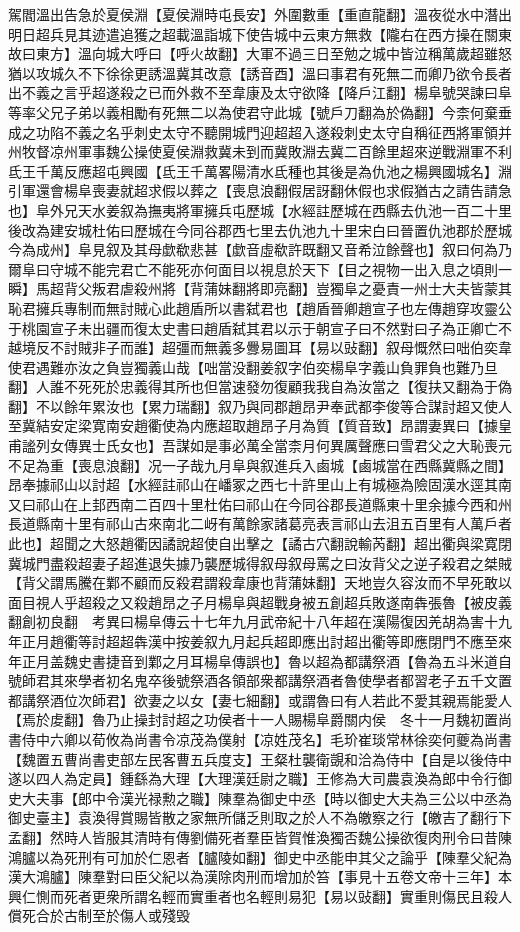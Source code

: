 駕閻溫出告急於夏侯淵【夏侯淵時屯長安】外圍數重【重直龍翻】溫夜從水中潛出明日超兵見其迹遣追獲之超載溫詣城下使告城中云東方無救【隴右在西方操在關東故曰東方】溫向城大呼曰【呼火故翻】大軍不過三日至勉之城中皆泣稱萬歲超雖怒猶以攻城久不下徐徐更誘溫冀其改意【誘音酉】溫曰事君有死無二而卿乃欲令長者出不義之言乎超遂殺之已而外救不至韋康及太守欲降【降戶江翻】楊阜號哭諫曰阜等率父兄子弟以義相勵有死無二以為使君守此城【號戶刀翻為於偽翻】今柰何棄垂成之功陷不義之名乎刺史太守不聽開城門迎超超入遂殺刺史太守自稱征西將軍領并州牧督凉州軍事魏公操使夏侯淵救冀未到而冀敗淵去冀二百餘里超來逆戰淵軍不利氐王千萬反應超屯興國【氐王千萬畧陽清水氐種也其後是為仇池之楊興國城名】淵引軍還會楊阜喪妻就超求假以葬之【喪息浪翻假居訝翻休假也求假猶古之請告請急也】阜外兄天水姜叙為撫夷將軍擁兵屯歷城【水經註歷城在西縣去仇池一百二十里後改為建安城杜佑曰歷城在今同谷郡西七里去仇池九十里宋白曰晉置仇池郡於歷城今為成州】阜見叙及其母歔欷悲甚【歔音虛欷許既翻又音希泣餘聲也】叙曰何為乃爾阜曰守城不能完君亡不能死亦何面目以視息於天下【目之視物一出入息之頃則一瞬】馬超背父叛君虐殺州將【背蒲妹翻將即亮翻】豈獨阜之憂責一州士大夫皆蒙其恥君擁兵專制而無討賊心此趙盾所以書弑君也【趙盾晉卿趙宣子也左傳趙穿攻靈公于桃園宣子未出疆而復太史書曰趙盾弑其君以示于朝宣子曰不然對曰子為正卿亡不越境反不討賊非子而誰】超彊而無義多釁易圖耳【易以䜴翻】叙母慨然曰咄伯奕韋使君遇難亦汝之負豈獨義山哉【咄當没翻姜叙字伯奕楊阜字義山負罪負也難乃旦翻】人誰不死死於忠義得其所也但當速發勿復顧我我自為汝當之【復扶又翻為于偽翻】不以餘年累汝也【累力瑞翻】叙乃與同郡趙昂尹奉武都李俊等合謀討超又使人至冀結安定梁寛南安趙衢使為内應超取趙昂子月為質【質音致】昂謂妻異曰【據皇甫謐列女傳異士氏女也】吾謀如是事必萬全當柰月何異厲聲應曰雪君父之大恥喪元不足為重【喪息浪翻】况一子哉九月阜與叙進兵入鹵城【鹵城當在西縣冀縣之間】昂奉據祁山以討超【水經註祁山在嶓冢之西七十許里山上有城極為險固漢水逕其南又曰祁山在上邽西南二百四十里杜佑曰祁山在今同谷郡長道縣東十里余據今西和州長道縣南十里有祁山古來南北二岈有萬餘家諸葛亮表言祁山去沮五百里有人萬戶者此也】超聞之大怒趙衢因譎說超使自出擊之【譎古穴翻說輸芮翻】超出衢與梁寛閉冀城門盡殺超妻子超進退失據乃襲歷城得叙母叙母罵之曰汝背父之逆子殺君之桀賊【背父謂馬騰在鄴不顧而反殺君謂殺韋康也背蒲妹翻】天地豈久容汝而不早死敢以面目視人乎超殺之又殺趙昂之子月楊阜與超戰身被五創超兵敗遂南犇張魯【被皮義翻創初良翻　考異曰楊阜傳云十七年九月武帝紀十八年超在漢陽復因羌胡為害十九年正月趙衢等討超超犇漢中按姜叙九月起兵超即應出討超出衢等即應閉門不應至來年正月盖魏史書捷音到鄴之月耳楊阜傳誤也】魯以超為都講祭酒【魯為五斗米道自號師君其來學者初名鬼卒後號祭酒各領部衆都講祭酒者魯使學者都習老子五千文置都講祭酒位次師君】欲妻之以女【妻七細翻】或謂魯曰有人若此不愛其親焉能愛人【焉於䖍翻】魯乃止操封討超之功侯者十一人賜楊阜爵關内侯　冬十一月魏初置尚書侍中六卿以荀攸為尚書令凉茂為僕射【凉姓茂名】毛玠崔琰常林徐奕何夔為尚書【魏置五曹尚書吏部左民客曹五兵度支】王粲杜襲衛覬和洽為侍中【自是以後侍中遂以四人為定員】鍾繇為大理【大理漢廷尉之職】王修為大司農袁渙為郎中令行御史大夫事【郎中令漢光禄勲之職】陳羣為御史中丞【時以御史大夫為三公以中丞為御史臺主】袁渙得賞賜皆散之家無所儲乏則取之於人不為皦察之行【皦吉了翻行下孟翻】然時人皆服其清時有傳劉備死者羣臣皆賀惟渙獨否魏公操欲復肉刑令曰昔陳鴻臚以為死刑有可加於仁恩者【臚陵如翻】御史中丞能申其父之論乎【陳羣父紀為漢大鴻臚】陳羣對曰臣父紀以為漢除肉刑而增加於笞【事見十五卷文帝十三年】本興仁惻而死者更衆所謂名輕而實重者也名輕則易犯【易以䜴翻】實重則傷民且殺人償死合於古制至於傷人或殘毁